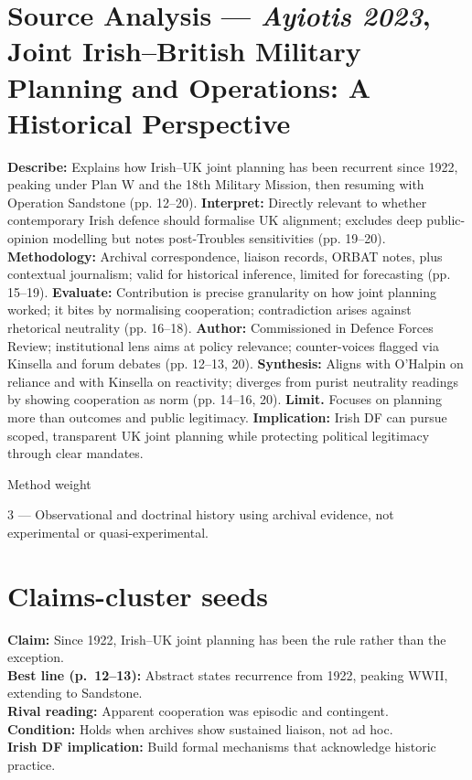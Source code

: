 \section*{Source Analysis — \textit{Ayiotis 2023}, Joint Irish–British Military Planning and Operations: A Historical Perspective}
\textbf{Describe:} Explains how Irish–UK joint planning has been recurrent since 1922, peaking under Plan W and the 18th Military Mission, then resuming with Operation Sandstone (pp. 12–20).
\textbf{Interpret:} Directly relevant to whether contemporary Irish defence should formalise UK alignment; excludes deep public-opinion modelling but notes post-Troubles sensitivities (pp. 19–20).
\textbf{Methodology:} Archival correspondence, liaison records, ORBAT notes, plus contextual journalism; valid for historical inference, limited for forecasting (pp. 15–19).
\textbf{Evaluate:} Contribution is precise granularity on how joint planning worked; it bites by normalising cooperation; contradiction arises against rhetorical neutrality (pp. 16–18).
\textbf{Author:} Commissioned in Defence Forces Review; institutional lens aims at policy relevance; counter-voices flagged via Kinsella and forum debates (pp. 12–13, 20).
\textbf{Synthesis:} Aligns with O’Halpin on reliance and with Kinsella on reactivity; diverges from purist neutrality readings by showing cooperation as norm (pp. 14–16, 20).
\textbf{Limit.} Focuses on planning more than outcomes and public legitimacy.
\textbf{Implication:} Irish DF can pursue scoped, transparent UK joint planning while protecting political legitimacy through clear mandates.

Method weight

3 — Observational and doctrinal history using archival evidence, not experimental or quasi-experimental.

\section*{Claims-cluster seeds}

\textbf{Claim:} Since 1922, Irish–UK joint planning has been the rule rather than the exception.\\
\textbf{Best line (p.~12--13):} Abstract states recurrence from 1922, peaking WWII, extending to Sandstone.\\
\textbf{Rival reading:} Apparent cooperation was episodic and contingent.\\
\textbf{Condition:} Holds when archives show sustained liaison, not ad hoc.\\
\textbf{Irish DF implication:} Build formal mechanisms that acknowledge historic practice.\\[0.5em]

